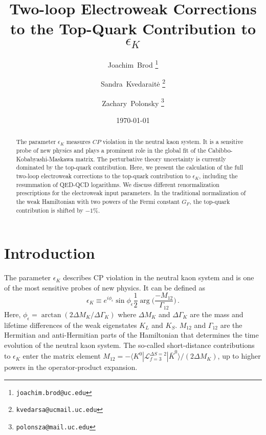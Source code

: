 \documentclass[letter,11pt,DIV=12,abstract=true,numbers=noenddot,titlepage=false,twocolumn=false,draft=false]{scrartcl}
\begin{document}
\renewcommand\Authands{, }

\title{\boldmath 
        Two-loop Electroweak Corrections to the Top-Quark Contribution to $\epsilon_K$
}
  
  
\date{\today}
\author{Joachim~Brod%
        \thanks{\texttt{joachim.brod@uc.edu}}}
\author{Sandra~Kvedarait\.e%
        \thanks{\texttt{kvedarsa@ucmail.uc.edu}}}
\author{Zachary~Polonsky%
        \thanks{\texttt{polonsza@mail.uc.edu}}}

\maketitle

\begin{abstract}
The parameter $\epsilon_K$ measures $CP$ violation in the neutral kaon
system. It is a sensitive probe of new physics and plays a prominent
role in the global fit of the Cabibbo-Kobabyashi-Maskawa matrix. The
perturbative theory uncertainty is currently dominated by the
top-quark contribution. Here, we present the calculation of the full
two-loop electroweak corrections to the top-quark contribution to
$\epsilon_K$, including the resummation of QED-QCD logarithms. We
discuss different renormalization prescriptions for the electroweak
input parameters. In the traditional normalization of the weak
Hamiltonian with two powers of the Fermi constant $G_F$, the top-quark
contribution is shifted by $-1\%$.
\end{abstract}
\setcounter{page}{1}

\section{Introduction}\label{sec:introduction}

The parameter $\epsilon_K$ describes CP violation in the neutral kaon
system and is one of the most sensitive probes of new physics. It can
be defined as~\cite{Proceedings:2001rdi}
\begin{equation}\label{eq:ek:def}
  \epsilon_K \equiv e^{i\phi_\epsilon} \sin\phi_\epsilon \frac{1}{2}
  \arg \bigg( \frac{-M_{12}}{\Gamma_{12}} \bigg)\,.
\end{equation}
Here, $\phi_\epsilon = \arctan(2\Delta M_K/\Delta\Gamma_K)$ where $\Delta M_K$ 
and $\Delta\Gamma_K$ are the mass and lifetime differences of the weak eigenstates 
$K_L$ and $K_S$. $M_{12}$ and $\Gamma_{12}$ are
the Hermitian and anti-Hermitian parts of the Hamiltonian that
determines the time evolution of the neutral kaon system. The
so-called short-distance contributions to $\epsilon_K$ enter
the matrix element $M_{12} = - \langle K^0 | \mathcal{L}^{\Delta S
  = 2}_{f=3}| \bar K^0 \rangle / (2\Delta M_K)$, up to higher powers
in the operator-product expansion.
\end{document}
